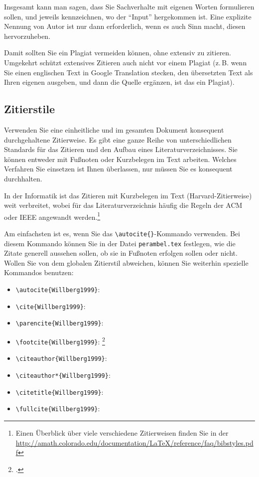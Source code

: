 \documentclass[conference,compsoc,final,a4paper]{IEEEtran}
\begin{document}
Insgesamt kann man sagen, dass Sie Sachverhalte mit eigenen Worten formulieren sollen, und jeweils kennzeichnen, wo der \enquote{Input} hergekommen ist. Eine explizite Nennung von Autor ist nur dann erforderlich, wenn es auch Sinn macht, diesen hervorzuheben.

Damit sollten Sie ein Plagiat vermeiden können, ohne extensiv zu zitieren. Umgekehrt schützt extensives Zitieren auch nicht vor einem Plagiat (z.\,B. wenn Sie einen englischen Text in Google Translation stecken, den übersetzten Text als Ihren eigenen ausgeben, und dann die Quelle ergänzen, ist das ein Plagiat).

\subsection{Zitierstile}
Verwenden Sie eine einheitliche und im gesamten Dokument konsequent durchgehaltene Zitierweise. Es gibt eine ganze Reihe von unterschiedlichen Standards für das Zitieren und den Aufbau eines Literaturverzeichnisses. Sie können entweder mit Fußnoten oder Kurzbelegen im Text arbeiten. Welches Verfahren Sie einsetzen ist Ihnen überlassen, nur müssen Sie es konsequent durchhalten.

In der Informatik ist das Zitieren mit Kurzbelegen im Text (Harvard-Zitierweise) weit verbreitet, wobei für das Literaturverzeichnis häufig die Regeln der \acs{ACM} oder \acs{IEEE} angewandt werden.\footnote{Einen Überblick über viele verschiedene Zitierweisen finden Sie in der \url{http://amath.colorado.edu/documentation/LaTeX/reference/faq/bibstyles.pdf}}

Am einfachsten ist es, wenn Sie das \lstinline+\autocite{}+-Kommando verwenden. Bei diesem Kommando können Sie in der Datei \texttt{perambel.tex} festlegen, wie die Zitate generell aussehen sollen, \zb ob sie in Fußnoten erfolgen sollen oder nicht. Wollen Sie von dem globalen Zitierstil abweichen, können Sie weiterhin spezielle Kommandos benutzen:

\begin{itemize}
	\item \lstinline+\autocite{Willberg1999}+: \autocite{Willberg1999}
	\item \lstinline+\cite{Willberg1999}+: \cite{Willberg1999}
	\item \lstinline+\parencite{Willberg1999}+: \parencite{Willberg1999}
	\item \lstinline+\footcite{Willberg1999}+: \footcite{Willberg1999}
	\item \lstinline+\citeauthor{Willberg1999}+: \citeauthor{Willberg1999}
	\item \lstinline+\citeauthor*{Willberg1999}+: \citeauthor*{Willberg1999}
	\item \lstinline++: \citetitle{Willberg1999}
	\item \lstinline++: \fullcite{Willberg1999}
\end{itemize}
\end{document}
